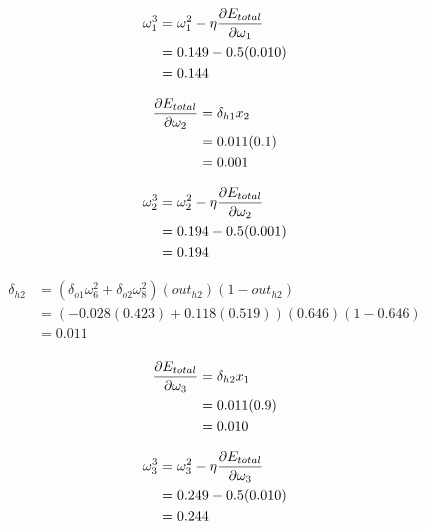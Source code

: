 \documentclass[10pt,a4paper]{article}
\begin{document}
\begin{equation}
\begin{split}
\omega_1^3 &= \omega_1^2 - \eta\pdv{E_{total}}{\omega_1}\\
           &= 0.149 -0.5(0.010)\\
           &= 0.144\\
\end{split}
\end{equation}

\begin{equation}
\begin{split}
\pdv{E_{total}}{\omega_2} &= \delta_{h1}x_2\\ 
                          &= 0.011(0.1)\\
                          &= 0.001\\
\end{split}
\end{equation}

\begin{equation}
\begin{split}
\omega_2^3 &= \omega_2^2 - \eta\pdv{E_{total}}{\omega_2}\\
           &= 0.194 -0.5(0.001)\\
           &= 0.194\\
\end{split}
\end{equation}

\begin{equation}
\begin{split}
\delta_{h2} &= (\delta_{o1}\omega_6^2 + \delta_{o2}\omega_8^2)(out_{h2})(1-out_{h2})\\
&= (-0.028(0.423) + 0.118(0.519))(0.646)(1-0.646)\\
&= 0.011\\
\end{split}
\end{equation}

\begin{equation}
\begin{split}
\pdv{E_{total}}{\omega_3} &= \delta_{h2}x_1\\ 
                          &= 0.011(0.9)\\
                          &= 0.010\\
\end{split}
\end{equation}

\begin{equation}
\begin{split}
\omega_3^3 &= \omega_3^2 - \eta\pdv{E_{total}}{\omega_3}\\
           &= 0.249 -0.5(0.010)\\
           &= 0.244\\
\end{split}
\end{equation}
\end{document}
